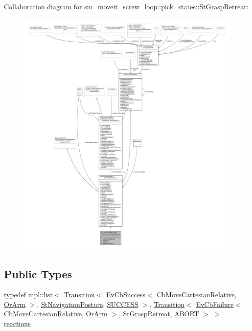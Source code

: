 Collaboration diagram for sm\+\_\+moveit\+\_\+screw\+\_\+loop\+:\+:pick\+\_\+states\+:\+:St\+Grasp\+Retreat\+:
\nopagebreak
\begin{figure}[H]
\begin{center}
\leavevmode
\includegraphics[width=350pt]{structsm__moveit__screw__loop_1_1pick__states_1_1StGraspRetreat__coll__graph}
\end{center}
\end{figure}
\subsection*{Public Types}
\begin{DoxyCompactItemize}
\item 
typedef mpl\+::list$<$ \hyperlink{classsmacc_1_1Transition}{Transition}$<$ \hyperlink{structsmacc_1_1EvCbSuccess}{Ev\+Cb\+Success}$<$ Cb\+Move\+Cartesian\+Relative, \hyperlink{classsm__moveit__screw__loop_1_1OrArm}{Or\+Arm} $>$, \hyperlink{structsm__moveit__screw__loop_1_1pick__states_1_1StNavigationPosture}{St\+Navigation\+Posture}, \hyperlink{structsmacc_1_1default__transition__tags_1_1SUCCESS}{S\+U\+C\+C\+E\+SS} $>$, \hyperlink{classsmacc_1_1Transition}{Transition}$<$ \hyperlink{structsmacc_1_1EvCbFailure}{Ev\+Cb\+Failure}$<$ Cb\+Move\+Cartesian\+Relative, \hyperlink{classsm__moveit__screw__loop_1_1OrArm}{Or\+Arm} $>$, \hyperlink{structsm__moveit__screw__loop_1_1pick__states_1_1StGraspRetreat}{St\+Grasp\+Retreat}, \hyperlink{structsmacc_1_1default__transition__tags_1_1ABORT}{A\+B\+O\+RT} $>$ $>$ \hyperlink{structsm__moveit__screw__loop_1_1pick__states_1_1StGraspRetreat_a53aef096927d0b4449e87ba0fb6aa240}{reactions}
\end{DoxyCompactItemize}
